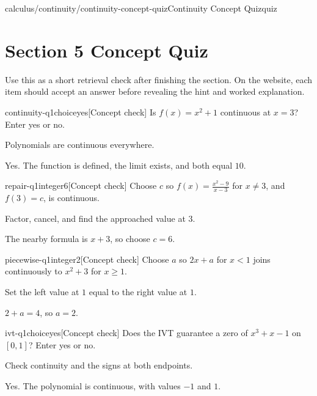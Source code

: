 \begin{webpage}{calculus/continuity/continuity-concept-quiz}{Continuity Concept Quiz}{quiz}
\section*{Section 5 Concept Quiz}

Use this as a short retrieval check after finishing the section. On the website, each item should accept an answer before revealing the hint and worked explanation.

\begin{bgcheck}{continuity-q1}{choice}{yes}[Concept check]
Is \(f(x)=x^2+1\) continuous at \(x=3\)? Enter yes or no.
\begin{bghint}
Polynomials are continuous everywhere.
\end{bghint}
\begin{bgreveal}
Yes. The function is defined, the limit exists, and both equal \(10\).
\end{bgreveal}
\end{bgcheck}

\begin{bgcheck}{repair-q1}{integer}{6}[Concept check]
Choose \(c\) so \(f(x)=\frac{x^2-9}{x-3}\) for \(x\ne3\), and \(f(3)=c\), is continuous.
\begin{bghint}
Factor, cancel, and find the approached value at \(3\).
\end{bghint}
\begin{bgreveal}
The nearby formula is \(x+3\), so choose \(c=6\).
\end{bgreveal}
\end{bgcheck}

\begin{bgcheck}{piecewise-q1}{integer}{2}[Concept check]
Choose \(a\) so \(2x+a\) for \(x<1\) joins continuously to \(x^2+3\) for \(x\ge1\).
\begin{bghint}
Set the left value at \(1\) equal to the right value at \(1\).
\end{bghint}
\begin{bgreveal}
\(2+a=4\), so \(a=2\).
\end{bgreveal}
\end{bgcheck}

\begin{bgcheck}{ivt-q1}{choice}{yes}[Concept check]
Does the IVT guarantee a zero of \(x^3+x-1\) on \([0,1]\)? Enter yes or no.
\begin{bghint}
Check continuity and the signs at both endpoints.
\end{bghint}
\begin{bgreveal}
Yes. The polynomial is continuous, with values \(-1\) and \(1\).
\end{bgreveal}
\end{bgcheck}


\end{webpage}

